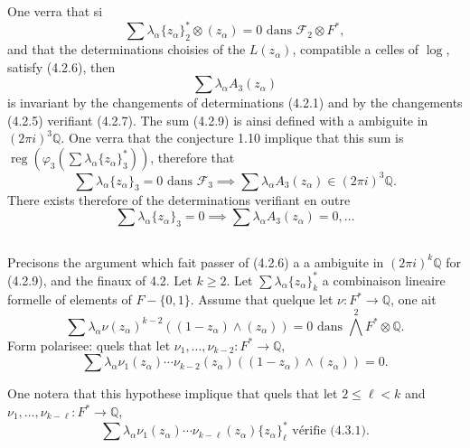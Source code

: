 \documentclass[12pt,a4paper]{article}
\theoremstyle{plain}
\theoremstyle{definition}
\theoremstyle{remark}
\DeclareMathOperator{\reg}{reg}
\newcommand{\Q}{\mathbb{Q}}
\newcommand{\F}{\mathcal{F}}
\begin{document}
{{One verra that si
\begin{equation}\label{eq:4.2.8}
\sum\lambda_\alpha\{z_\alpha\}_2^*\otimes(z_\alpha)=0\text{ dans }\F_2\otimes F^*,\tag{4.2.8}
\end{equation}
and that the determinations choisies of the $L(z_\alpha)$, compatible {a} celles of $\log$, satisfy (4.2.6), then
\begin{equation}\label{eq:4.2.9}
\sum\lambda_\alpha A_3(z_\alpha)\tag{4.2.9}
\end{equation}
is invariant by the changements of determinations (4.2.1) and by the changements (4.2.5) verifiant (4.2.7). The sum (4.2.9) is ainsi defined with a ambiguite in $(2\pi i)^3\Q$. One verra that the conjecture 1.10 implique that this sum is $\reg(\varphi_3(\sum\lambda_\alpha\{z_\alpha\}_3^*))$, therefore that
\begin{equation*}
\sum\lambda_\alpha\{z_\alpha\}_3=0\text{ dans }\F_3 \implies \sum\lambda_\alpha A_3(z_\alpha)\in(2\pi i)^3\Q.
\end{equation*}
There exists therefore of the determinations verifiant en outre
\begin{equation*}
\sum\lambda_\alpha\{z_\alpha\}_3=0 \implies \sum\lambda_\alpha A_3(z_\alpha)=0,\ldots
\end{equation*}

\subsection{}

Precisons the argument which fait passer of (4.2.6) {a} a ambiguite in $(2\pi i)^k\Q$ for (4.2.9), and the finaux of 4.2. Let $k\geq 2$. Let $\sum\lambda_\alpha\{z_\alpha\}_k^*$ a combinaison lineaire formelle of elements of $F-\{0,1\}$. Assume that quelque let $\nu:F^*\to\Q$, one ait
\begin{equation}\label{eq:4.3.1}
\sum\lambda_\alpha\nu(z_\alpha)^{k-2}((1-z_\alpha)\wedge(z_\alpha))=0\text{ dans }\bigwedge^2F^*\otimes\Q.\tag{4.3.1}
\end{equation}
Form polarisee: quels that let $\nu_1,\ldots,\nu_{k-2}:F^*\to\Q$,
\begin{equation}\label{eq:4.3.2}
\sum\lambda_\alpha\nu_1(z_\alpha)\cdots\nu_{k-2}(z_\alpha)((1-z_\alpha)\wedge(z_\alpha))=0.\tag{4.3.2}
\end{equation}

One notera that this hypothese implique that quels that let $2\leq\ell<k$ and $\nu_1,\ldots,\nu_{k-\ell}:F^*\to\Q$,
\begin{equation}\label{eq:4.3.3}
\sum\lambda_\alpha\nu_1(z_\alpha)\cdots\nu_{k-\ell}(z_\alpha)\{z_\alpha\}_\ell^*\text{ v\'erifie (4.3.1).}\tag{4.3.3}
\end{equation}

}}
\end{document}
